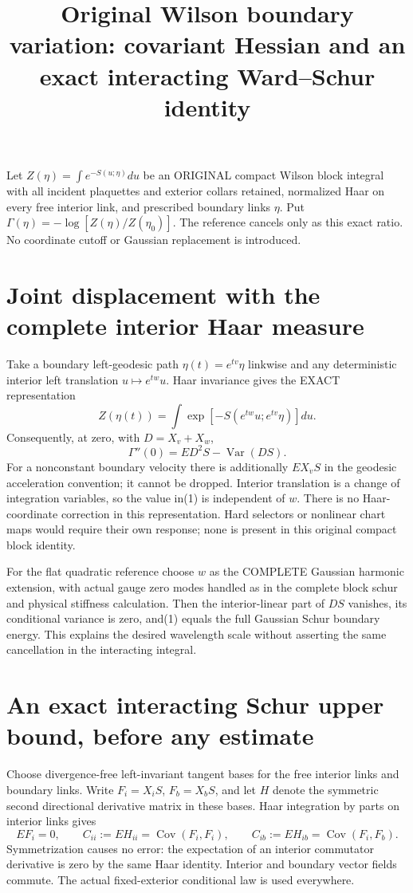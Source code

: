 \documentclass{article}
\title{Original Wilson boundary variation: covariant Hessian and an exact interacting Ward–Schur identity}\author{}\date{}
\begin{document}
\maketitle
Let $Z(\eta)=\int e^{-S(u;\eta)}du$ be an ORIGINAL compact Wilson block integral with all incident plaquettes and exterior collars retained, normalized Haar on every free interior link, and prescribed boundary links $\eta$. Put $\Gamma(\eta)=-\log[Z(\eta)/Z(\eta_0)]$. The reference cancels only as this exact ratio. No coordinate cutoff or Gaussian replacement is introduced.

\section*{Joint displacement with the complete interior Haar measure}
Take a boundary left-geodesic path $\eta(t)=e^{tv}\eta$ linkwise and any deterministic interior left translation $u\mapsto e^{tw}u$. Haar invariance gives the EXACT representation
\[
 Z(\eta(t))=\int \exp[-S(e^{tw}u;e^{tv}\eta)]du.
\]
Consequently, at zero, with $D=X_v+X_w$,
\[
 \Gamma''(0)=E D^2S-\operatorname{Var}(DS).             \tag{1}
\]
For a nonconstant boundary velocity there is additionally $E X_{\dot v}S$ in the geodesic acceleration convention; it cannot be dropped. Interior translation is a change of integration variables, so the value in(1) is independent of $w$. There is no Haar-coordinate correction in this representation. Hard selectors or nonlinear chart maps would require their own response; none is present in this original compact block identity.

For the flat quadratic reference choose $w$ as the COMPLETE Gaussian harmonic extension, with actual gauge zero modes handled as in the complete block schur and physical stiffness calculation. Then the interior-linear part of $DS$ vanishes, its conditional variance is zero, and(1) equals the full Gaussian Schur boundary energy. This explains the desired wavelength scale without asserting the same cancellation in the interacting integral.

\section*{An exact interacting Schur upper bound, before any estimate}
Choose divergence-free left-invariant tangent bases for the free interior links and boundary links. Write $F_i=X_iS$, $F_b=X_bS$, and let $H$ denote the symmetric second directional derivative matrix in these bases. Haar integration by parts on interior links gives
\[
 E F_i=0,\qquad C_{ii}:=E H_{ii}=\operatorname{Cov}(F_i,F_i),\qquad
 C_{ib}:=E H_{ib}=\operatorname{Cov}(F_i,F_b).           \tag{2}
\]
Symmetrization causes no error: the expectation of an interior commutator derivative is zero by the same Haar identity. Interior and boundary vector fields commute. The actual fixed-exterior conditional law is used everywhere.
\end{document}
